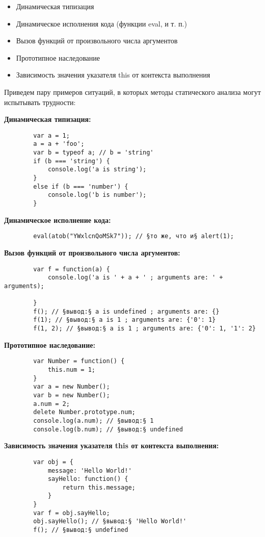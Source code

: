 	\begin{itemize}
		\item Динамическая типизация
		\item Динамическое исполнения кода (функции eval, и т. п.)
		\item Вызов функций от произвольного числа аргументов
		\item Прототипное наследование
		\item Зависимость значения указателя this от контекста выполнения
	\end{itemize}
	\bigskip

	Приведем пару примеров ситуаций, в которых методы статического анализа могут испытывать трудности:


	\bigskip
	\textbf{Динамическая типизация:}
	\begin{lstlisting}
		var a = 1;
		a = a + 'foo';
		var b = typeof a; // b = 'string'
		if (b === 'string') {
			console.log('a is string');
		}
		else if (b === 'number') {
			console.log('b is number');
		}
	\end{lstlisting}

	\bigskip
	\textbf{Динамическое исполнение кода:}
	\begin{lstlisting}
		eval(atob("YWxlcnQoMSk7")); // §то же, что и§ alert(1);
	\end{lstlisting}

	\bigskip
	\textbf{Вызов функций от произвольного числа аргументов:}
	\begin{lstlisting}
		var f = function(a) {
			console.log('a is ' + a + ' ; arguments are: ' + arguments);
			
		}
		f(); // §вывод:§ a is undefined ; arguments are: {}
		f(1); // §вывод:§ a is 1 ; arguments are: {'0': 1}
		f(1, 2); // §вывод:§ a is 1 ; arguments are: {'0': 1, '1': 2}
	\end{lstlisting}		

	\bigskip
	\textbf{Прототипное наследование:}
	\begin{lstlisting}
		var Number = function() {
			this.num = 1;
		}
		var a = new Number();
		var b = new Number();
		a.num = 2;
		delete Number.prototype.num;
		console.log(a.num); // §вывод:§ 1
		console.log(b.num); // §вывод:§ undefined
	\end{lstlisting}	

	\bigskip
	\textbf{Зависимость значения указателя this от контекста выполнения:}
	\begin{lstlisting}
		var obj = {
			message: 'Hello World!'
			sayHello: function() {
				return this.message;
			}
		}
		var f = obj.sayHello;
		obj.sayHello(); // §вывод:§ 'Hello World!'
		f(); // §вывод:§ undefined
	\end{lstlisting}	


